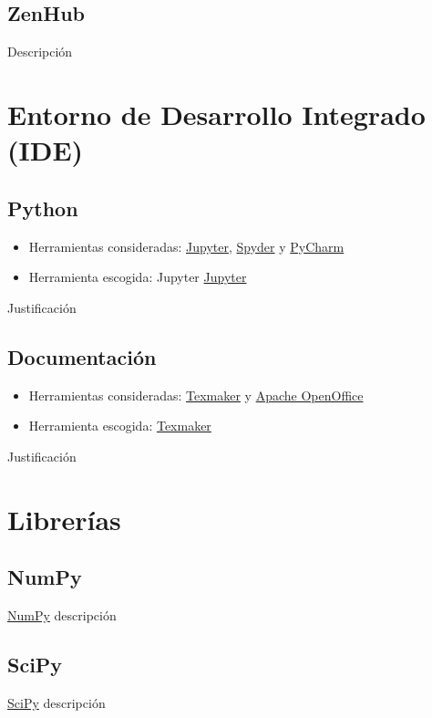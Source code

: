 \subsection{ZenHub}\label{zenhub}
Descripción

\section{Entorno de Desarrollo Integrado (IDE)}\label{ide}
\subsection{Python}\label{python}
\begin{itemize}
\tightlist
\item Herramientas consideradas: 
	\href{https://jupyter.org/}{Jupyter}, 
	\href{https://www.spyder-ide.org/}{Spyder} y
	\href{https://www.jetbrains.com/pycharm/}{PyCharm}
\item Herramienta escogida:
	Jupyter \href{https://jupyter.org/}{Jupyter}
\end{itemize}
Justificación

\subsection{Documentación}\label{documentacion}
\begin{itemize}
\tightlist
\item Herramientas consideradas: 
	\href{http://www.xm1math.net/texmaker/}{Texmaker} y
	\href{https://www.openoffice.org/es/}{Apache OpenOffice}
\item Herramienta escogida:
	\href{http://www.xm1math.net/texmaker/}{Texmaker}
\end{itemize}
Justificación

\section{Librerías}\label{librerias}
\subsection{NumPy}\label{numpy}
\href{http://www.numpy.org/}{NumPy} descripción

\subsection{SciPy}\label{scipy}
\href{https://www.scipy.org/scipylib/index.html}{SciPy} descripción


